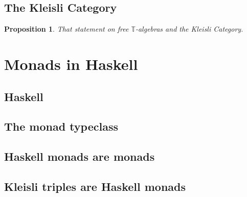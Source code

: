 \documentclass[a4paper]{article}
\theoremstyle{plain}
\newtheorem{proposition}[theorem]{Proposition}
\theoremstyle{definition}
\begin{document}
\subsection{The Kleisli Category}
\begin{proposition}
    That statement on free $\mathbb{T}$-algebras and the Kleisli Category.
\end{proposition}

\section{Monads in Haskell}
\subsection{Haskell}
\subsection{The monad typeclass}
\subsection{Haskell monads are monads}
\subsection{Kleisli triples are Haskell monads}
\end{document}

